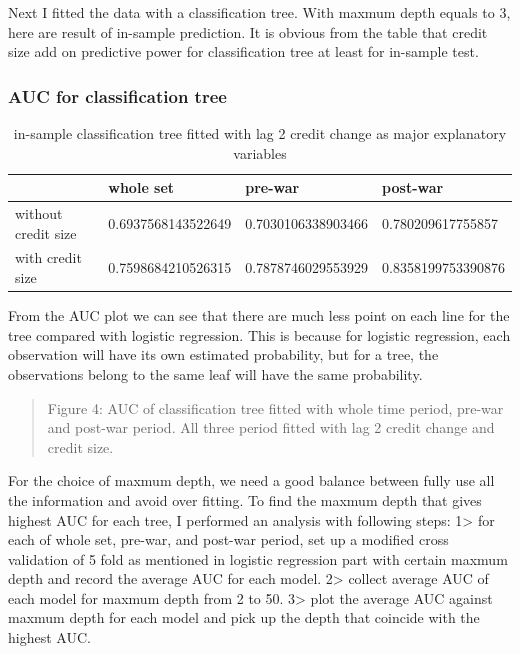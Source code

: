 \documentclass{article}
\newcommand{\ciapdf}[1]{\vspace*{-\parskip}\begin{center}\resizebox{0.75\textwidth}{!}{\texttt{[image: \#1]}}\end{center}}
\begin{document}
Next I fitted the data with a classification tree. With maxmum depth
equals to 3, here are result of in-sample prediction. It is obvious from
the table that credit size add on predictive power for classification
tree at least for in-sample test.

\subsubsection*{AUC for classification tree}

\begin{table}[H]
    \caption{
    in-sample classification tree fitted with lag 2 credit change
    as major explanatory variables
    }
    \begin{center}\begin{tabular}{|l|l|l|l|}
    \hline
                        & whole set          & pre-war            & post-war           \\ \hline
    without credit size & 0.6937568143522649 & 0.7030106338903466 & 0.780209617755857  \\ \hline
    with credit size    & 0.7598684210526315 & 0.7878746029553929 & 0.8358199753390876 \\ \hline
    \end{tabular}\end{center}
\end{table}

From the AUC plot we can see that there are much less point on each line
for the tree compared with logistic regression. This is because for
logistic regression, each observation will have its own estimated
probability, but for a tree, the observations belong to the same leaf
will have the same probability.

\ciapdf{Figure_5.pdf}
\begin{quote}
Figure 4: AUC of classification tree fitted with whole time period,
pre-war and post-war period. All three period fitted with lag 2 credit
change and credit size.
\end{quote}

For the choice of maxmum depth, we need a good balance between fully use
all the information and avoid over fitting. To find the maxmum depth
that gives highest AUC for each tree, I performed an analysis with
following steps: 1\textgreater{} for each of whole set, pre-war, and
post-war period, set up a modified cross validation of 5 fold as
mentioned in logistic regression part with certain maxmum depth and
record the average AUC for each model. 2\textgreater{} collect average
AUC of each model for maxmum depth from 2 to 50. 3\textgreater{} plot
the average AUC against maxmum depth for each model and pick up the
depth that coincide with the highest AUC.
\end{document}
